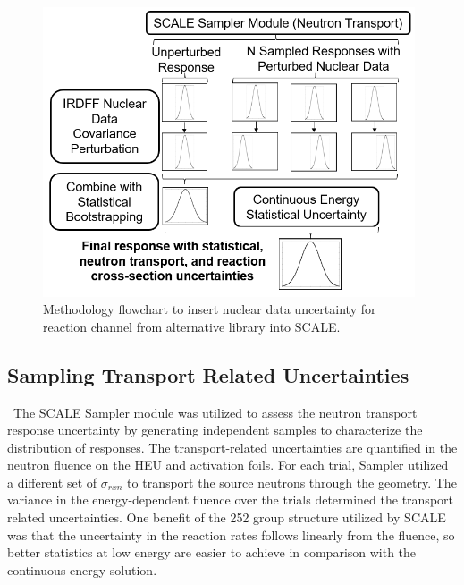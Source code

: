 \begin{figure}[htb!]
	\centering
	\includegraphics[width=11cm]{Figures/Chapter3/Method.png}
	\caption{Methodology flowchart to insert nuclear data uncertainty for reaction channel from alternative library into SCALE.}
	\label{fig:method1}
\end{figure}


\subsection{Sampling Transport Related Uncertainties}

\ The SCALE Sampler module was utilized to assess the neutron transport response uncertainty by generating independent samples to characterize the distribution of responses.
The transport-related uncertainties are quantified in the neutron fluence on the HEU and activation foils. 
For each trial, Sampler utilized a different set of $\sigma_{rxn}$ to transport the source neutrons through the geometry. 
The variance in the energy-dependent fluence over the trials determined the transport related uncertainties. 
One benefit of the 252 group structure utilized by SCALE was that the uncertainty in the reaction rates follows linearly from the fluence, so better statistics at low energy are easier to achieve in comparison with the continuous energy solution. 

